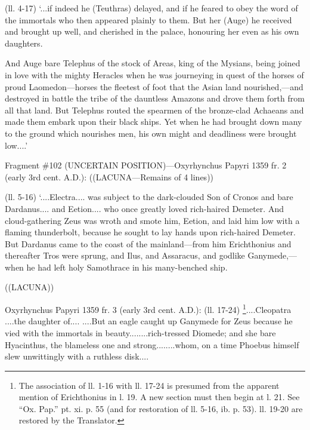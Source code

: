 (ll. 4-17) ‘...if indeed he (Teuthras) delayed, and if he feared to obey
the word of the immortals who then appeared plainly to them. But her (Auge) he
received and brought up well, and cherished in the palace, honouring her even
as his own daughters.

And Auge bare Telephus of the stock of Areas, king of the Mysians, being joined
in love with the mighty Heracles when he was journeying in quest of the horses
of proud Laomedon—horses the fleetest of foot that the Asian land
nourished,—and destroyed in battle the tribe of the dauntless Amazons and
drove them forth from all that land. But Telephus routed the spearmen of the
bronze-clad Achaeans and made them embark upon their black ships. Yet when he
had brought down many to the ground which nourishes men, his own might and
deadliness were brought low....’

Fragment \#102 (UNCERTAIN POSITION)—Oxyrhynchus Papyri 1359 fr. 2 (early
3rd cent. A.D.): ((LACUNA—Remains of 4 lines))

(ll. 5-16) ‘....Electra.... was subject to the dark-clouded Son of Cronos
and bare Dardanus.... and Eetion.... who once greatly loved rich-haired
Demeter. And cloud-gathering Zeus was wroth and smote him, Eetion, and laid him
low with a flaming thunderbolt, because he sought to lay hands upon rich-haired
Demeter. But Dardanus came to the coast of the mainland—from him
Erichthonius and thereafter Tros were sprung, and Ilus, and Assaracus, and
godlike Ganymede,—when he had left holy Samothrace in his many-benched
ship.

((LACUNA))

Oxyrhynchus Papyri 1359 fr. 3 (early 3rd cent. A.D.): (ll. 17-24) \footnote{The association of ll.
1-16 with ll. 17-24 is presumed from the apparent mention of Erichthonius in l.
19. A new section must then begin at l. 21. See “Ox. Pap.” pt. xi.
p. 55 (and for restoration of ll. 5-16, ib. p. 53). ll. 19-20 are restored by
the Translator.}....Cleopatra ....the daughter
of.... ....But an eagle caught up Ganymede for Zeus because he vied with the
immortals in beauty........rich-tressed Diomede; and she bare Hyacinthus, the
blameless one and strong........whom, on a time Phoebus himself slew
unwittingly with a ruthless disk....


